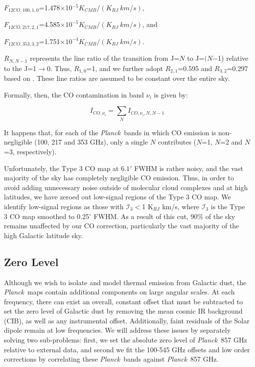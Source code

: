 \documentclass{emulateapj}
\newcommand{\PLANCK}{{\it Planck}}
\begin{document}
\noindent
$F_{12CO, 100, 1, 0}$=1.478$\times$10$^{-5}$$K_{CMB}/(K_{RJ} \ km/s)$,

\noindent
$F_{12CO, 217, 2, 1}$=4.585$\times$$10^{-5}$$K_{CMB}/(K_{RJ} \ km/s)$, and 

\noindent
$F_{12CO, 353, 3, 2}$=1.751$\times$$10^{-4}$$K_{CMB}/(K_{RJ} \ km/s)$.

\noindent
$R_{N, N-1}$ represents the line ratio of the transition from J=$N$ to 
J=$(N$$-$1) relative to the J=1$\rightarrow$0. Thus, $R_{1,0}$=1, and we 
further adopt $R_{2,1}$=0.595 and $R_{3,2}$=0.297 based on \cite{planckco}. 
These line ratios are assumed to be constant over the entire sky. 

Formally, then, the CO contamination in band $\nu_i$ is given by:

\begin{equation} \label{equ:molcorr}
I_{CO, \nu_i} = \sum\limits_{N} I_{CO, \nu_i, N, N-1}
\end{equation}

It happens that, for each of the \PLANCK~bands in which CO emission is
non-negligible (100, 217 and 353 GHz), only a single $N$ contributes ($N$=1, 
$N$=2 and $N$=3, respectively). 

Unfortunately, the Type 3 CO map at $6.1'$ FWHM is rather noisy, and the vast
majority of the sky has completely negligible CO emission. Thus, in order to 
avoid adding unnecessary noise outside of molecular cloud complexes and at high
latitudes, we have zeroed out low-signal regions of the Type 3 CO map. We 
identify  low-signal regions as those with $\mathcal{I}_3$$<$1 K$_{RJ}$ km/s, 
where $\mathcal{I}_3$ is the Type 3 CO map smoothed to 0.25$^{\circ}$ FWHM. As 
a result of this cut, 90\% of the sky remains unaffected by our CO correction, 
particularly the vast majority of the high Galactic latitude sky.

\subsection{Zero Level}
\label{sec:zp}

Although we wish to isolate and model thermal emission from Galactic dust, the
\PLANCK~maps contain additional components on large angular scales. At each 
frequency, there can exist an overall, constant offset that must be subtracted 
to set the zero level of Galactic dust by removing the mean cosmic IR 
background (CIB), as well as any instrumental offset. Additionally, faint 
residuals of the Solar dipole remain at low frequencies. We will address these 
issues by separately solving two sub-problems: first, we set the absolute zero 
level of \PLANCK~857 GHz relative to external data, and second we fit the 
100-545 GHz offsets and low order corrections by correlating these 
\PLANCK~bands against \PLANCK~857 GHz.
\end{document}
